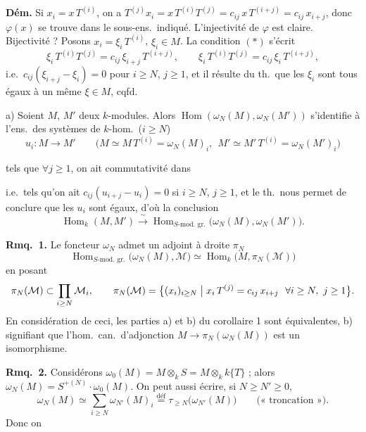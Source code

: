 \documentclass[11pt,a4paper]{article}
\begin{document}
\textbf{Dém.}   Si $x_i = x\, T^{(i)}$, on a
$T^{(j)} x_i = x\, T^{(i)} T^{(j)} = c_{ij}\, x\, T^{(i+j)} = c_{ij}\, x_{i+j}$, donc
$\varphi(x)$ se trouve dans le sous-ens.\ indiqué. L'injectivité de $\varphi$ est claire.
Bijectivité ? Posons $x_i = \xi_i\, T^{(i)}$, $\xi_i \in M$. La condition $(*)$ s'écrit
\[
  \xi_i\, T^{(i)} T^{(j)} = c_{ij}\, \xi_{i+j}\, T^{(i+j)} ,
  \qquad \xi_i\, T^{(i)} T^{(j)} = c_{ij}\, \xi_i\, T^{(i+j)} ,
\]
i.e.\ $c_{ij} (\xi_{i+j} - \xi_i) = 0$ pour $i \geq N$, $j \geq 1$, et il résulte du th.\
que les $\xi_i$ sont tous égaux à un même $\xi \in M$, cqfd.

a) Soient $M$, $M'$ deux $k$-modules. Alors $\operatorname{Hom}(\omega_N(M), \omega_N(M'))$
s'identifie à l'ens.\ des systèmes de $k$-hom.\ ($i \geq N$)
\[
  u_i : M \to M' \qquad
  \bigl( M \simeq M\, T^{(i)} = \omega_N(M)_i ,\ \ M' \simeq M'\, T^{(i)} = \omega_N(M')_i \bigr)
\]

tels que $\forall j \geq 1$, on ait commutativité dans


i.e.\ tels qu'on ait $c_{ij}(u_{i+j} - u_i) = 0$ si $i \geq N$, $j \geq 1$, et le th.\ nous
permet de conclure que les $u_i$ sont égaux, d'où la conclusion
\[
  \operatorname{Hom}_k(M, M') \xrightarrow{\ \sim\ }
  \operatorname{Hom}_{S\text{-mod.\ gr.}}\bigl(\omega_N(M), \omega_N(M')\bigr) .
\]

\textbf{Rmq.\ 1.} Le foncteur $\omega_N$ admet un adjoint à droite $\pi_N$
\[
  \operatorname{Hom}_{S\text{-mod.\ gr.}}\bigl(\omega_N(M), \mathcal{M}\bigr)
  \simeq \operatorname{Hom}_k\bigl(M, \pi_N(\mathcal{M})\bigr)
\]
en posant
\[
  \pi_N(\mathcal{M}) \subset \prod_{i \geq N} \mathcal{M}_i ,\qquad
  \pi_N(\mathcal{M}) = \bigl\{ (x_i)_{i \geq N} \bigm| x_i\, T^{(j)} = c_{ij}\, x_{i+j}
  \ \ \forall i \geq N,\ j \geq 1 \bigr\} .
\]
En considération de ceci,  les parties a) et b) du corollaire 1 sont
équivalentes, b) signifiant que l'hom.\ can.\ d'adjonction
$M \to \pi_N(\omega_N(M))$ est \struck{\ill{}} un isomorphisme.

\textbf{Rmq.\ 2.} Considérons $\omega_0(M) = M \otimes_k S = M \otimes_k k\{T\}$ ; alors
$\omega_N(M) = S^{+(N)} \cdot \omega_0(M)$. \struck{\ill{}} On peut aussi écrire,
si $N \geq N' \geq 0$,
\[
  \omega_N(M) \simeq \sum_{i \geq N} \omega_{N'}(M)_i
  \overset{\text{déf}}{=} \tau_{\geq N}\bigl(\omega_{N'}(M)\bigr)
  \qquad \text{(« troncation »)} .
\]
Donc on
\end{document}
